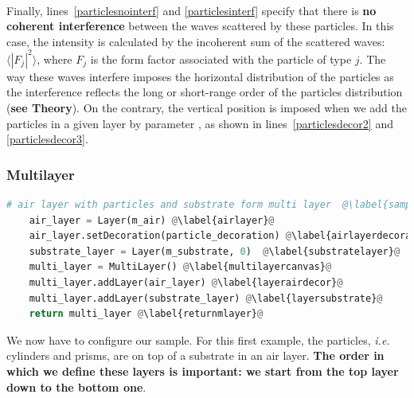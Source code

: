 \\


\noindent Finally, lines~\ref{particlesnointerf} and
\ref{particlesinterf} specify that there is \textbf{no coherent interference} between
the waves scattered by these particles. In this case, the intensity is calculated by
the incoherent sum of the scattered waves: $\langle |F_j|^2\rangle$,
where $F_j$ is the form factor associated with the particle of type $j$.  The way these waves
interfere imposes the horizontal distribution of
the particles as
the interference reflects the long or short-range order of the
particles distribution (\textbf{see Theory}). On the contrary, the vertical position is
imposed when we add the particles in a given layer by parameter , as shown in lines~\ref{particlesdecor2} and \ref{particlesdecor3}.


%
\subsubsection{Multilayer}
\begin{lstlisting}[language=python, style=eclipseboxed,name=ex1,nolol]
# air layer with particles and substrate form multi layer  @\label{sampleassembling}@
    air_layer = Layer(m_air) @\label{airlayer}@
    air_layer.setDecoration(particle_decoration) @\label{airlayerdecorator}@
    substrate_layer = Layer(m_substrate, 0)  @\label{substratelayer}@
    multi_layer = MultiLayer() @\label{multilayercanvas}@
    multi_layer.addLayer(air_layer) @\label{layerairdecor}@
    multi_layer.addLayer(substrate_layer) @\label{layersubstrate}@
    return multi_layer @\label{returnmlayer}@
\end{lstlisting}
We now have to configure our sample. For this first example,
the particles, \textit{i.e.} cylinders and prisms, are on top of a substrate in an
air layer. \textbf{The order in which we define these layers is important: we
start from the top layer down to the bottom one}.


